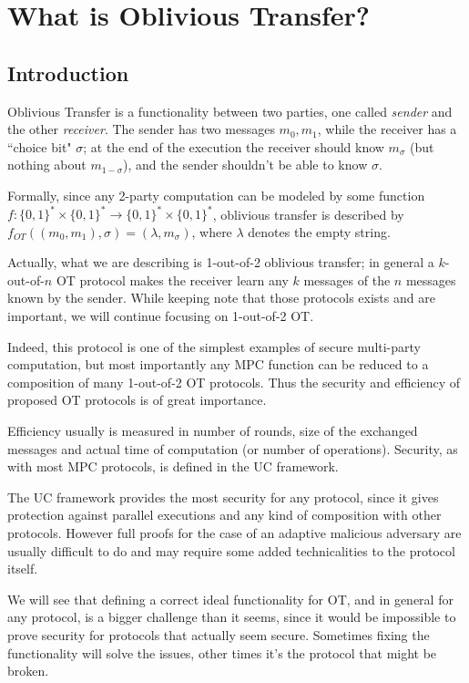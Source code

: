 \chapter{What is Oblivious Transfer?}

\section{Introduction}
Oblivious Transfer is a functionality between two parties, one called \emph{sender} and the other \emph{receiver}. The sender has two messages $m_0,m_1$, while the receiver has a ``choice bit" $\sigma$; at the end of the execution the receiver should know $m_\sigma$ (but nothing about $m_{1-\sigma}$), and the sender shouldn't be able to know $\sigma$.

Formally, since any 2-party computation can be modeled by some function $f:\{0,1\}^\ast\times\{0,1\}^\ast\to\{0,1\}^\ast\times\{0,1\}^\ast$, oblivious transfer is described by $f_{OT}((m_0,m_1), \sigma)=(\lambda, m_\sigma)$, where $\lambda$ denotes the empty string.

Actually, what we are describing is 1-out-of-2 oblivious transfer; in general a $k$-out-of-$n$ OT protocol makes the receiver learn any $k$ messages of the $n$ messages known by the sender. While keeping note that those protocols exists and are important, we will continue focusing on 1-out-of-2 OT.

Indeed, this protocol is one of the simplest examples of secure multi-party computation, but most importantly any MPC function can be reduced to a composition of many 1-out-of-2 OT protocols. Thus the security and efficiency of proposed OT protocols is of great importance.

Efficiency usually is measured in number of rounds, size of the exchanged messages and actual time of computation (or number of operations). Security, as with most MPC protocols, is defined in the UC framework.

The UC framework provides the most security for any protocol, since it gives protection against parallel executions and any kind of composition with other protocols. However full proofs for the case of an adaptive malicious adversary are usually difficult to do and may require some added technicalities to the protocol itself.

We will see that defining a correct ideal functionality for OT, and in general for any protocol, is a bigger challenge than it seems, since it would be impossible to prove security for protocols that actually seem secure. Sometimes fixing the functionality will solve the issues, other times it's the protocol that might be broken.

